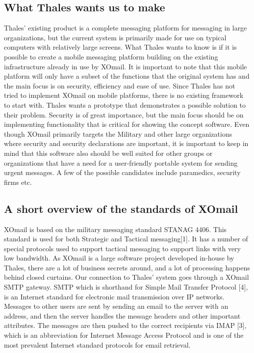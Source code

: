 \subsection*{What Thales wants us to make}
Thales’ existing product is a complete messaging platform for messaging in large organizations, but the current system is primarily made for use on typical computers with relatively large screens. What Thales wants to know is if it is possible to create a mobile messaging platform building on the existing infrastructure already in use by XOmail. It is important to note that this mobile platform will only have a subset of the functions that the original system has and the main focus is on security, efficiency and ease of use.
\newline
\newline
Since Thales has not tried to implement XOmail on mobile platforms, there is no existing framework to start with. Thales wants a prototype that demonstrates a possible solution to their problem. Security is of great importance, but the main focus should be on implementing functionality that is critical for showing the concept software.  
\newline
\newline
Even though XOmail primarily targets the Military and other large organizations where security and security declarations are important, it is important to keep in mind that this software also should be well suited for other groups or organizations that have a need for a user-friendly portable system for sending urgent messages. A few of the possible candidates include paramedics, security firms etc. 

\subsection*{A short overview of the standards of XOmail}
XOmail is based on the military messaging standard STANAG 4406. This standard is used for both Strategic and Tactical messaging[1]. It has a number of special protocols used to support tactical messaging to support links with very low bandwidth.
\newline
\newline
As XOmail is a large software project developed in-house by Thales, there are a lot of business secrets around, and a lot of processing happens behind closed curtains. Our connection to Thales’ system goes through a XOmail SMTP gateway. SMTP which is shorthand for Simple Mail Transfer Protocol [4], is an Internet standard for electronic mail transmission over IP networks. Messages to other users are sent by sending an email to the server with an address, and then the server handles the message headers and other important attributes. The messages are then pushed to the correct recipients via IMAP [3], which is an abbreviation for Internet Message Access Protocol and is one of the most prevalent Internet standard protocols for email retrieval. 

